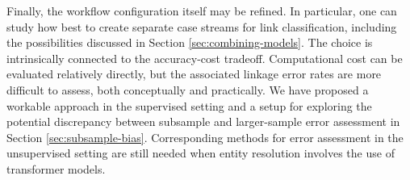 Finally, the workflow configuration itself may be refined. In particular, one can study how
best to create separate case streams for link classification, including the possibilities
discussed in Section \ref{sec:combining-models}. The choice is intrinsically connected to
the accuracy-cost tradeoff. Computational cost can be evaluated relatively directly, but
the associated linkage error rates are more difficult to assess, both conceptually and
practically. We have proposed a workable approach in the supervised setting and a setup
for exploring the potential discrepancy between subsample and larger-sample error
assessment in Section \ref{sec:subsample-bias}. Corresponding methods for error
assessment in the unsupervised setting are still needed when entity resolution involves
the use of transformer models.